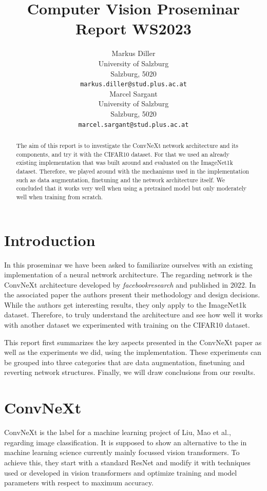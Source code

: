 \documentclass{article}
\title{Computer Vision Proseminar Report WS2023}
\author{%
    Markus Diller\\
    University of Salzburg\\
    Salzburg, 5020 \\
    \texttt{markus.diller@stud.plus.ac.at} \\
    \And
    Marcel Sargant \\
    University of Salzburg \\
    Salzburg, 5020 \\
    \texttt{marcel.sargant@stud.plus.ac.at} \\
}
\begin{document}
\maketitle


\begin{abstract}
    The aim of this report is to investigate the ConvNeXt network architecture and its components, and try it with the CIFAR10 dataset.
    For that we used an already existing implementation that was built around and evaluated on the ImageNet1k dataset.
    Therefore, we played around with the mechanisms used in the implementation such as data augmentation, finetuning and the network architecture itself.
    We concluded that it works very well when using a pretrained model but only moderately well when training from scratch.
\end{abstract}


\section{Introduction}\label{sec:introduction}
In this proseminar we have been asked to familiarize ourselves with an existing implementation of a neural network architecture.
The regarding network is the ConvNeXt architecture developed by \textit{facebookresearch} and published in 2022.
In the associated paper the authors present their methodology and design decisions.
While the authors get interesting results, they only apply to the ImageNet1k dataset.
Therefore, to truly understand the architecture and see how well it works with another dataset we experimented with training on the CIFAR10 dataset.

This report first summarizes the key aspects presented in the ConvNeXt paper as well as the experiments we did, using the implementation.
These experiments can be grouped into three categories that are data augmentation, finetuning and reverting network structures.
Finally, we will draw conclusions from our results.

\section{ConvNeXt}\label{sec:convnext}
ConvNeXt\cite{liu2022convnet} is the label for a machine learning project of Liu, Mao et al., regarding image classification.
It is supposed to show an alternative to the in machine learning science currently mainly focussed vision transformers.
To achieve this, they start with a standard ResNet and modify it with techniques used or developed in vision transformers and optimize training and model parameters with respect to maximum accuracy.
\end{document}
